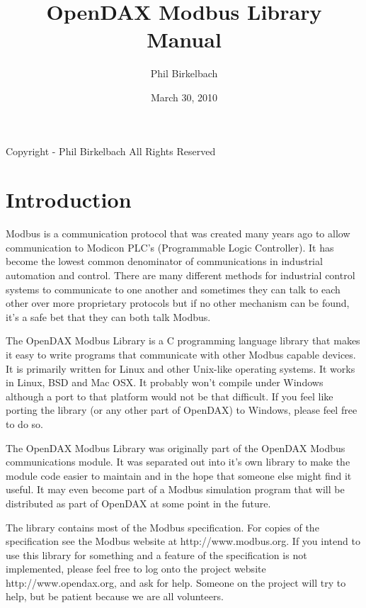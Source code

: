 \documentclass[10pt,letterpaper]{report}
\title{OpenDAX Modbus Library Manual}
\date{March 30, 2010}
\author{Phil Birkelbach}
\begin{document}
\begin{titlepage}
\maketitle

\begin{flushleft}
Copyright  - Phil Birkelbach\linebreak
All Rights Reserved
\end{flushleft}

\end{titlepage}
\tableofcontents
\newpage

\chapter{Introduction}
Modbus is a communication protocol that was created many years ago to allow communication to Modicon PLC's (Programmable Logic Controller).  It has become the lowest common denominator of communications in industrial automation and control.  There are many different methods for industrial control systems to communicate to one another and sometimes they can talk to each other over more proprietary protocols but if no other mechanism can be found, it's a safe bet that they can both talk Modbus.

The OpenDAX Modbus Library is a C programming language library that makes it easy to write programs that communicate with other Modbus capable devices.  It is primarily written for Linux and other Unix-like operating systems.  It works in Linux, BSD and Mac OSX.  It probably won't compile under Windows although a port to that platform would not be that difficult.  If you feel like porting the library (or any other part of OpenDAX) to Windows, please feel free to do so.

The OpenDAX Modbus Library was originally part of the OpenDAX Modbus communications module.  It was separated out into it's own library to make the module code easier to maintain and in the hope that someone else might find it useful.  It may even become part of a Modbus simulation program that will be distributed as part of OpenDAX at some point in the future.

The library contains most of the Modbus specification.  For copies of the specification see the Modbus website at http://www.modbus.org.  If you intend to use this library for something and a feature of the specification is not implemented, please feel free to log onto the project website http://www.opendax.org, and ask for help.  Someone on the project will try to help, but be patient because we are all volunteers.
\end{document}
